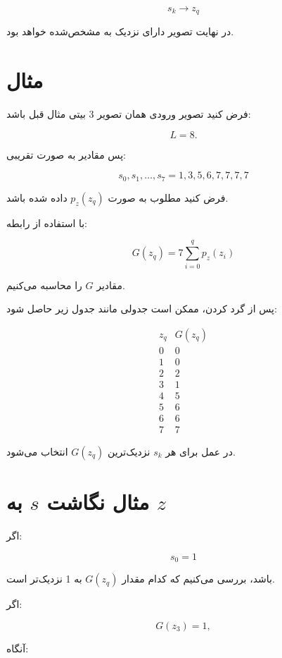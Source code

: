 \documentclass[12pt,a4paper]{article}
\begin{document}
	\[
	\boxed{
		s_k\rightarrow z_q
	}
	\]
	
	در نهایت تصویر دارای  نزدیک به  مشخص‌شده خواهد بود.
	
	
	\section{مثال }
	
	فرض کنید تصویر ورودی همان تصویر 3 بیتی مثال قبل باشد:
	
	\[
	L=8.
	\]
	
	پس مقادیر  به صورت تقریبی:
	
	\[
	\boxed{
		s_0,s_1,\ldots,s_7
		=
		1,3,5,6,7,7,7,7
	}
	\tag{26}
	\]
	
	فرض کنید  مطلوب به صورت $p_z(z_q)$ داده شده باشد.
	
	با استفاده از رابطه:
	
	\[
	G(z_q)
	=
	7
	\sum_{i=0}^{q}p_z(z_i)
	\]
	
	مقادیر $G$ را محاسبه می‌کنیم.
	
	پس از گرد کردن، ممکن است جدولی مانند جدول زیر حاصل شود:
	
	\[
	\begin{array}{c|c}
		z_q&G(z_q)\\
		\hline
		0&0\\
		1&0\\
		2&2\\
		3&1\\
		4&5\\
		5&6\\
		6&6\\
		7&7
	\end{array}
	\]
	
	در عمل برای هر $s_k$ نزدیک‌ترین $G(z_q)$ انتخاب می‌شود.
	
	
	\section{مثال نگاشت $s$ به $z$}
	
	اگر:
	
	\[
	s_0=1
	\]
	
	باشد، بررسی می‌کنیم که کدام مقدار $G(z_q)$ به 1 نزدیک‌تر است.
	
	اگر:
	
	\[
	G(z_3)=1,
	\]
	
	آنگاه:
	
\end{document}
